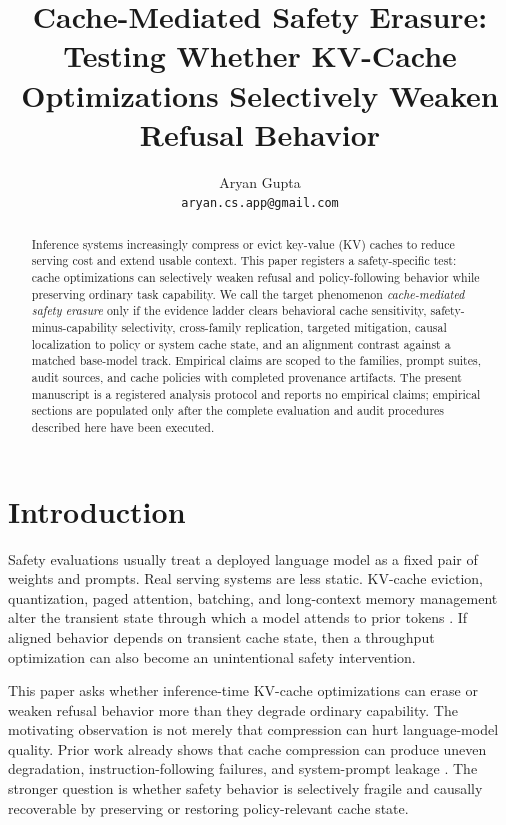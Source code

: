 \documentclass[11pt]{article}
\title{Cache-Mediated Safety Erasure:\\
Testing Whether KV-Cache Optimizations Selectively Weaken Refusal Behavior}
\author{
  Aryan Gupta\\
  \texttt{aryan.cs.app@gmail.com}
}
\date{}
\newcommand{\EmpiricalStatusSentence}{%
The present manuscript is a registered analysis protocol and reports no empirical claims; empirical sections are populated only after the complete evaluation and audit procedures described here have been executed.%
}
\begin{document}
\maketitle

\begin{abstract}
Inference systems increasingly compress or evict key-value (KV) caches to reduce serving cost and extend usable context. This paper registers a safety-specific test: cache optimizations can selectively weaken refusal and policy-following behavior while preserving ordinary task capability. We call the target phenomenon \emph{cache-mediated safety erasure} only if the evidence ladder clears behavioral cache sensitivity, safety-minus-capability selectivity, cross-family replication, targeted mitigation, causal localization to policy or system cache state, and an alignment contrast against a matched base-model track. Empirical claims are scoped to the families, prompt suites, audit sources, and cache policies with completed provenance artifacts. \EmpiricalStatusSentence
\end{abstract}

\section{Introduction}

Safety evaluations usually treat a deployed language model as a fixed pair of weights and prompts. Real serving systems are less static. KV-cache eviction, quantization, paged attention, batching, and long-context memory management alter the transient state through which a model attends to prior tokens \citep{kwon2023pagedattention}. If aligned behavior depends on transient cache state, then a throughput optimization can also become an unintentional safety intervention.

This paper asks whether inference-time KV-cache optimizations can erase or weaken refusal behavior more than they degrade ordinary capability. The motivating observation is not merely that compression can hurt language-model quality. Prior work already shows that cache compression can produce uneven degradation, instruction-following failures, and system-prompt leakage \citep{chen2025pitfalls,ananthanarayanan2026physics,yang2024notoken}. The stronger question is whether safety behavior is selectively fragile and causally recoverable by preserving or restoring policy-relevant cache state.
\end{document}
